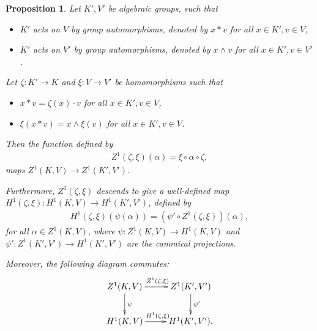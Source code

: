 \documentclass[12pt, a4paper]{amsart}
\newtheorem{prop}{Proposition}
\begin{document}
\begin{prop} Let $K', V'$ be algebraic groups, such that
	\begin{itemize}
		\item[(a)] $K'$ acts on $V$ by group automorphisms, denoted by $x \ast v$ for all $x \in K', v \in V$,
		\item[(b)] $K'$ acts on $V'$ by group automorphisms, denoted by $x \wedge v$ for all $x \in K', v \in V'$.
	\end{itemize}
	Let $\zeta:K' \rightarrow K$ and $\xi: V \rightarrow V'$ be homomorphisms such that
	\begin{itemize}
		\item[(c)] $x \ast v = \zeta(x) \cdot v$ for all $x \in K', v \in V$,
		\item[(d)] $\xi(x \ast v) = x \wedge \xi(v)$ for all $x \in K', v \in V$.
	\end{itemize}
	Then the function defined by
	\begin{align*}
		Z^1(\zeta, \xi)(\alpha) = \xi \circ \alpha \circ \zeta,
	\end{align*}
	maps $Z^1(K, V) \rightarrow Z^1(K', V')$.

	Furthermore, $Z^1(\zeta, \xi)$ descends to give a well-defined map $H^1(\zeta, \xi):H^1(K, V) \rightarrow H^1(K', V')$, defined by
	\begin{align*}
		H^1(\zeta, \xi)(\psi(\alpha)) = \left(\psi' \circ Z^1(\zeta, \xi)\right)(\alpha),
	\end{align*}
	for all $\alpha \in Z^1(K, V)$, where $\psi:Z^1(K, V)\rightarrow H^1(K, V)$ and $\psi':Z^1(K', V') \rightarrow H^1(K', V')$ are the canonical projections.

	Moreover, the following diagram commutes:
	\begin{align*}
		\xymatrix{
			Z^1(K, V) \ar[r]^{Z^1(\zeta, \xi)} \ar[d]^{\psi} & Z^1(K', V') \ar[d]^{\psi'} \\
			H^1(K, V) \ar[r]^{H^1(\zeta, \xi)}               & H^1(K', V').
		}
	\end{align*}
\end{prop}
\end{document}
